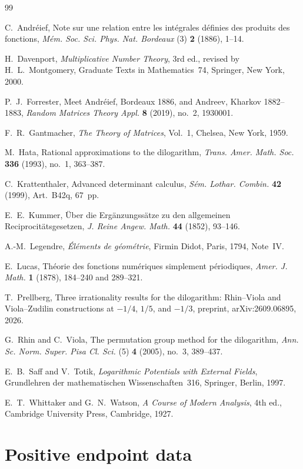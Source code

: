 \documentclass{amsart}
\numberwithin{equation}{section}
\numberwithin{table}{section}
\begin{document}
\begin{thebibliography}{99}

C.~Andr\'eief,
Note sur une relation entre les int\'egrales d\'efinies des produits des
fonctions,
\emph{M\'em. Soc. Sci. Phys. Nat. Bordeaux} (3) \textbf{2} (1886), 1--14.

H.~Davenport,
\emph{Multiplicative Number Theory}, 3rd ed., revised by H.~L.~Montgomery,
Graduate Texts in Mathematics~74, Springer, New York, 2000.

P.~J.~Forrester,
Meet Andr\'eief, Bordeaux 1886, and Andreev, Kharkov 1882--1883,
\emph{Random Matrices Theory Appl.} \textbf{8} (2019), no.~2, 1930001.

F.~R.~Gantmacher,
\emph{The Theory of Matrices}, Vol.~1,
Chelsea, New York, 1959.

M.~Hata,
Rational approximations to the dilogarithm,
\emph{Trans. Amer. Math. Soc.} \textbf{336} (1993), no.~1, 363--387.

C.~Krattenthaler,
Advanced determinant calculus,
\emph{S\'em. Lothar. Combin.} \textbf{42} (1999), Art.~B42q, 67~pp.

E.~E.~Kummer,
\"Uber die Erg\"anzungss\"atze zu den allgemeinen Reciprocit\"atsgesetzen,
\emph{J. Reine Angew. Math.} \textbf{44} (1852), 93--146.

A.-M.~Legendre,
\emph{\'El\'ements de g\'eom\'etrie}, Firmin Didot, Paris, 1794, Note~IV.

E.~Lucas,
Th\'eorie des fonctions num\'eriques simplement p\'eriodiques,
\emph{Amer. J. Math.} \textbf{1} (1878), 184--240 and 289--321.

T.~Prellberg,
Three irrationality results for the dilogarithm: Rhin--Viola and
Viola--Zudilin constructions at $-1/4$, $1/5$, and $-1/3$,
preprint, arXiv:2609.06895, 2026.

G.~Rhin and C.~Viola,
The permutation group method for the dilogarithm,
\emph{Ann. Sc. Norm. Super. Pisa Cl. Sci.} (5) \textbf{4} (2005), no.~3,
389--437.

E.~B.~Saff and V.~Totik,
\emph{Logarithmic Potentials with External Fields},
Grundlehren der mathematischen Wissenschaften~316, Springer, Berlin, 1997.

E.~T.~Whittaker and G.~N.~Watson,
\emph{A Course of Modern Analysis}, 4th ed.,
Cambridge University Press, Cambridge, 1927.

\end{thebibliography}

\appendix
\section{Positive endpoint data}\label{sec:positive-data}



\end{document}
